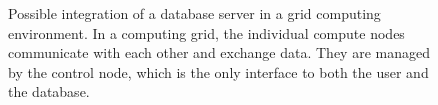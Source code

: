 \begin{figure}[h]
	\centering
	\def\svgwidth{0.8\textwidth}
	
	\caption[Possible integration of a database in a grid computing environment]{
		Possible integration of a database server in a grid computing environment. In
		a computing grid, the individual compute nodes communicate with each other
		and exchange data. They are managed by the control node, which is the only
		interface to both the user and the database.
	}
	\label{fig:cluster}
\end{figure}
